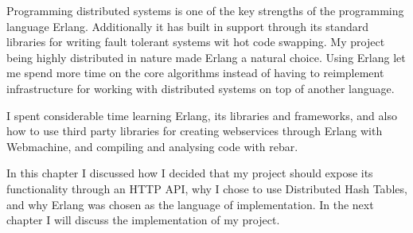 
\mbox{}

Programming distributed systems is one of the key strengths of the programming language Erlang. Additionally it has built in support through its standard libraries for writing fault tolerant systems wit hot code swapping. My project being highly distributed in nature made Erlang a natural choice. Using Erlang let me spend more time on the core algorithms instead of having to reimplement infrastructure for working with distributed systems on top of another language.

I spent considerable time learning Erlang, its libraries and frameworks, and also how to use third party libraries for creating webservices through Erlang with Webmachine, and compiling and analysing code with rebar.

% 

\mbox{} %

In this chapter I discussed how I decided that my project should expose its functionality through an HTTP API, why I chose to use Distributed Hash Tables, and why Erlang was chosen as the language of implementation.
In the next chapter I will discuss the implementation of my project.
